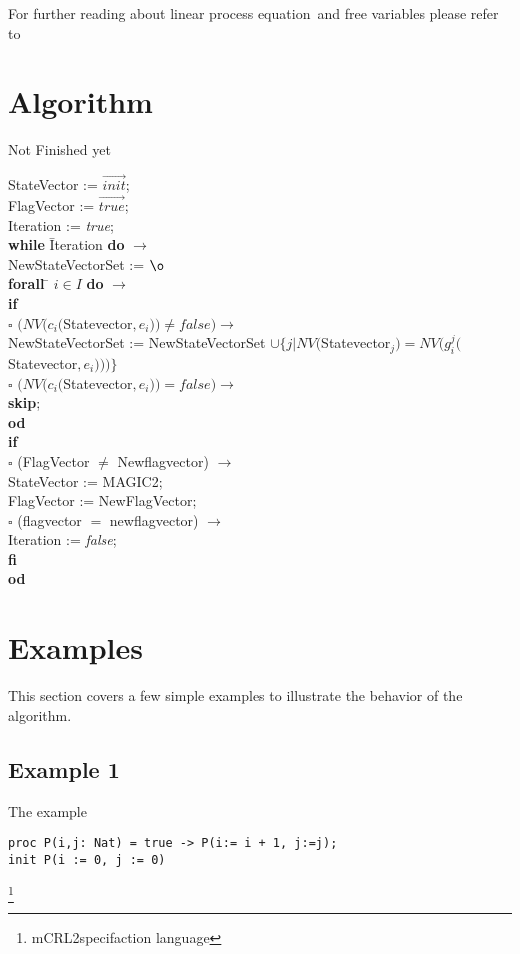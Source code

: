 \documentclass[a4paper,10pt]{article}
\newcommand{\lpe}{linear process equation}
\newcommand{\ovr}{\overrightarrow}
\newcommand{\mcrl}{mCRL2}
\newcommand{\ti}{\textit}
\newcommand{\tb}{\textbf}
\newcommand{\ra}{$\rightarrow$}
\newcommand{\sq}{$\square$}
\begin{document}
For further reading about \lpe\ and free variables please refer to \cite{LPEfreevar} 
\newpage
\section{Algorithm} \label{sec:alg}
Not Finished yet
\begin{tabbing} 
StateVector := $\ovr{init}$; \\
FlagVector := $\ovr{true}$; \\
Iteration := \ti{true}; \\
\tb{while} \= Iteration \tb{do} \ra \\
  \> NewStateVectorSet := $\o$\\
  \> \tb{forall} \= $i \in I$ \tb{do} \ra \\
  \>  \>   \tb{if} \= \verb" " \=\\
  \>  \>   \sq \> $(NV(c_i($Statevector$,e_i)) \neq false) \rightarrow$ \\
  \>  \>       \> \>NewStateVectorSet := NewStateVectorSet $\cup \lbrace j \vert NV($Statevector$_j) = NV(g_i^j($Statevector$,e_i))) \rbrace$ \\
  \>  \>  \sq \>  $(NV(c_i($Statevector$,e_i)) = false) \rightarrow$ \\
  \>  \>  \> \>\tb{skip};\\
  \>  \tb{od} \\
  \>  \tb{if}  \\
  \>  \sq  \> (FlagVector $\neq$ Newflagvector) \ra \\ 
  \>       \>  \> StateVector := MAGIC2; \\
  \>       \>  \> FlagVector :=  NewFlagVector; \\
  \>  \sq \>  (flagvector $=$ newflagvector) \ra  \\
  \>      \> \> Iteration := \ti{false};\\
  \>  \tb{fi} \\
  \tb{od}\\
\end{tabbing} 

\section{Examples}
This section covers a few simple examples to illustrate the behavior of the algorithm. 
\subsection{Example 1} The example \\
\begin{verbatim}
proc P(i,j: Nat) = true -> P(i:= i + 1, j:=j);
init P(i := 0, j := 0)
\end{verbatim} \footnote{\mcrl specifaction language}
\end{document}

